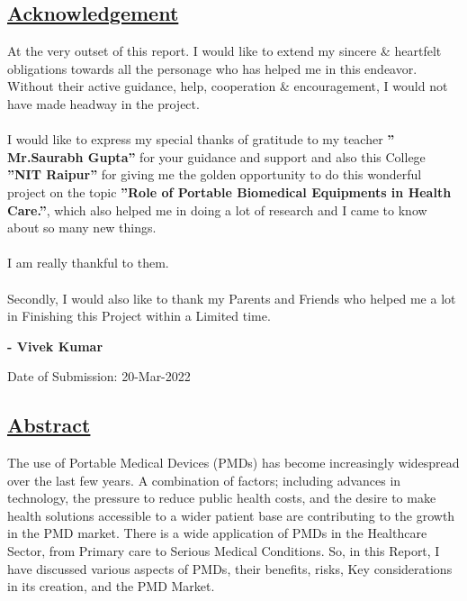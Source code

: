 \documentclass[12pt]{article}
\begin{document}
\clearpage
\pagestyle{fancy}
\begin{center}
\section*{\underline{Acknowledgement}}
\end{center}
\doublespacing
At the very outset of this report. I would like to extend my sincere \& heartfelt obligations towards all the personage who has helped me in this endeavor. Without their active guidance, help, cooperation \& encouragement, I would not have made headway in the project.\\
\\
I would like to express my special thanks of gratitude to my teacher \textbf{'' Mr.Saurabh Gupta''} for your guidance and support and also this College \textbf{''NIT Raipur''} for giving me the golden opportunity to do this wonderful project on the topic \textbf{''Role of Portable Biomedical Equipments in Health Care.''}, which also helped me in doing a lot of research and I came to know about so many new things.\\
\\
I am really thankful to them.\\
\\
Secondly, I would also like to thank my Parents and Friends who helped me a lot in Finishing this Project within a Limited time.\\
\begin{flushright}
\textbf{- Vivek Kumar}
\end{flushright}
\vfill
Date of Submission: 20-Mar-2022
\clearpage
\singlespacing
\begin{center}
\section*{\underline{Abstract}}
The use of Portable Medical Devices (PMDs) has become increasingly widespread over the last few years. A combination of factors; including advances in technology, the pressure to reduce public health costs, and the desire to make health solutions accessible to a wider patient base are contributing to the growth in the PMD market.
There is a wide application of PMDs in the Healthcare Sector, from Primary care to Serious Medical Conditions. So, in this Report, I have discussed various aspects of PMDs, their benefits, risks, Key considerations in its creation, and the PMD Market. 
\end{center}
\clearpage
\pagestyle{fancy}
\begin{center}
\tableofcontents
\end{center}
\end{document}
